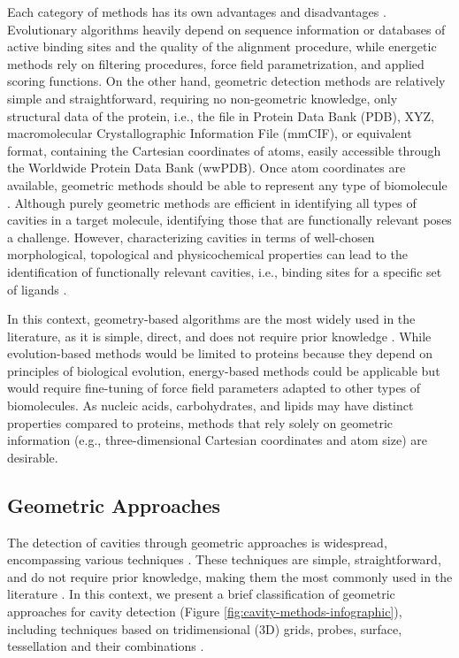 \documentclass[Ingles]{phdthesis}
\def\ie{i.e.\onedot}
\begin{document}
Each category of methods has its own advantages and disadvantages \cite{sotriffer2002,henrich2010,simoes2017}. Evolutionary algorithms heavily depend on sequence information or databases of active binding sites and the quality of the alignment procedure, while energetic methods rely on filtering procedures, force field parametrization, and applied scoring functions. On the other hand, geometric detection methods are relatively simple and straightforward, requiring no non-geometric knowledge, only structural data of the protein, \ie, the file in Protein Data Bank (PDB), XYZ, macromolecular Crystallographic Information File (mmCIF), or equivalent format, containing the Cartesian coordinates of atoms, easily accessible through the Worldwide Protein Data Bank (wwPDB). Once atom coordinates are available, geometric methods should be able to represent any type of biomolecule \cite{henrich2010,oliveira2014,simoes2017}. Although purely geometric methods are efficient in identifying all types of cavities in a target molecule, identifying those that are functionally relevant poses a challenge. However, characterizing cavities in terms of well-chosen morphological, topological and physicochemical properties can lead to the identification of functionally relevant cavities, \ie, binding sites for a specific set of ligands \cite{sotriffer2002,henrich2010,liang1998,guerra2019}. 

In this context, geometry-based algorithms are the most widely used in the literature, as it is simple, direct, and does not require prior knowledge \cite{henrich2010,oliveira2014}. While evolution-based methods would be limited to proteins because they depend on principles of biological evolution, energy-based methods could be applicable but would require fine-tuning of force field parameters adapted to other types of biomolecules. As nucleic acids, carbohydrates, and lipids may have distinct properties compared to proteins, methods that rely solely on geometric information (e.g., three-dimensional Cartesian coordinates and atom size) are desirable.


\subsection{Geometric Approaches \label{sec:geometric-approaches}}

The detection of cavities through geometric approaches is widespread, encompassing various techniques \cite{simoes2017,guerra2020}. These techniques are simple, straightforward, and do not require prior knowledge, making them the most commonly used in the literature \cite{henrich2010,oliveira2014}. In this context, we present a brief classification of geometric approaches for cavity detection (Figure \ref{fig:cavity-methods-infographic}), including techniques based on tridimensional (3D) grids, probes, surface, tessellation and their combinations \cite{simoes2017,guerra2020,guerra2023B}.
\end{document}
